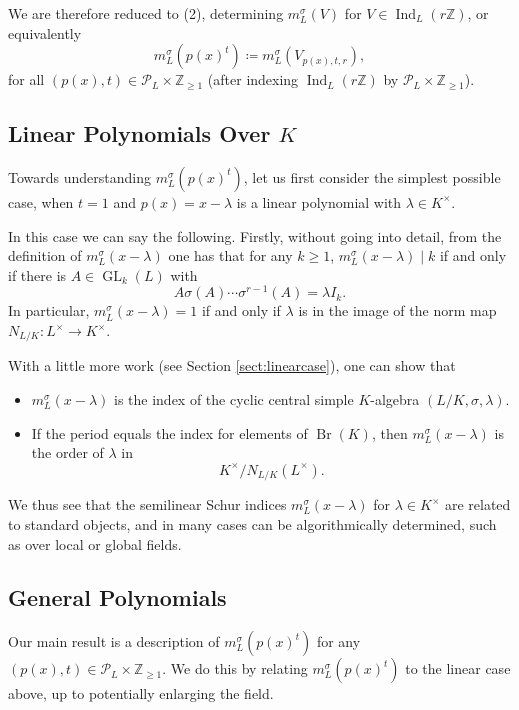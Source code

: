 \documentclass[10pt, reqno, hidelinks]{amsart}
\DeclareMathOperator{\Br}{Br}
\DeclareMathOperator{\Ind}{Ind}
\DeclareMathOperator{\GL}{GL}
\newcommand{\bZ}{{\mathbb Z}}
\newcommand{\sP}{{\mathcal P}}
\numberwithin{thm}{subsection}
\theoremstyle{definition}
\begin{document}
We are therefore reduced to (2), determining $m_L^{\sigma}(V)$ for $V \in \Ind_L(r\bZ)$, or equivalently
\[
m_L^{\sigma}(p(x)^t) \coloneqq m_L^{\sigma}(V_{p(x), t, r}),
\]
for all $(p(x),t) \in \sP_L \times \bZ_{\geq 1}$ (after indexing $\Ind_L(r\bZ)$ by $\sP_L \times \bZ_{\geq 1}$).

\subsection*{Linear Polynomials Over $K$}

Towards understanding $m_L^{\sigma}(p(x)^t)$, let us first consider the simplest possible case, when $t = 1$ and $p(x) = x - \lambda$ is a linear polynomial with $\lambda \in K^{\times}$.

In this case we can say the following. Firstly, without going into detail, from the definition of $m_L^{\sigma}(x-\lambda)$ one has that for any $k \geq 1$, $m_L^{\sigma}(x-\lambda) \mid k$ if and only if there is $A \in \GL_k(L)$ with 
	\[
		A \sigma(A) \cdots \sigma^{r-1}(A) = \lambda I_k.
	\]
In particular, $m_L^{\sigma}(x-\lambda) = 1$ if and only if $\lambda$ is in the image of the norm map $N_{L/K} \colon L^{\times} \rightarrow K^{\times}$.

With a little more work (see Section \ref{sect:linearcase}), one can show that
\begin{itemize}
	\item $m_L^{\sigma}(x-\lambda)$ is the index of the cyclic central simple $K$-algebra $(L/K, \sigma, \lambda)$.
	\item If the period equals the index for elements of $\Br(K)$, then $m_L^{\sigma}(x-\lambda)$ is the order of $\lambda$ in 
	\[
		K^{\times} / N_{L/K}(L^{\times}).
	\]
\end{itemize}

We thus see that the semilinear Schur indices $m_L^{\sigma}(x-\lambda)$ for $\lambda \in K^{\times}$ are related to standard objects, and in many cases can be algorithmically determined, such as over local or global fields.

\subsection*{General Polynomials}

Our main result is a description of $m_L^{\sigma}(p(x)^t)$ for any $(p(x),t) \in \sP_L \times \bZ_{\geq 1}$. We do this by relating $m_L^{\sigma}(p(x)^t)$ to the linear case above, up to potentially enlarging the field.
\end{document}
